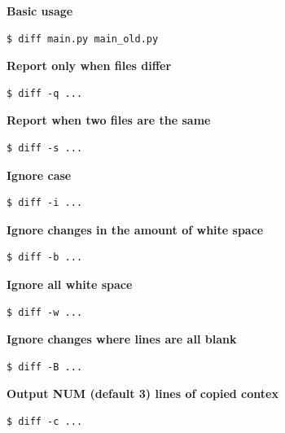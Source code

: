 \documentclass{article}
\newenvironment{codetemplate}[1][]{%
  \mybasecolorbox[#1]
  \itshape
}{%
  \endmybasecolorbox
}
\begin{document}
\textbf{Basic usage}
\begin{codetemplate}{}
\begin{verbatim}
$ diff main.py main_old.py
\end{verbatim}
\end{codetemplate}

\textbf{Report only when files differ}
\begin{codetemplate}{}
\begin{verbatim}
$ diff -q ...
\end{verbatim}
\end{codetemplate}

\textbf{Report when two files are the same}
\begin{codetemplate}{}
\begin{verbatim}
$ diff -s ...
\end{verbatim}
\end{codetemplate}

\textbf{Ignore case}
\begin{codetemplate}{}
\begin{verbatim}
$ diff -i ...
\end{verbatim}
\end{codetemplate}

\textbf{Ignore changes in the amount of white space}
\begin{codetemplate}{}
\begin{verbatim}
$ diff -b ...
\end{verbatim}
\end{codetemplate}

\textbf{Ignore all white space}
\begin{codetemplate}{}
\begin{verbatim}
$ diff -w ...
\end{verbatim}
\end{codetemplate}

\textbf{Ignore changes where lines are all blank}
\begin{codetemplate}{}
\begin{verbatim}
$ diff -B ...
\end{verbatim}
\end{codetemplate}

\textbf{Output NUM (default 3) lines of copied contex}
\begin{codetemplate}{}
\begin{verbatim}
$ diff -c ...
\end{verbatim}
\end{codetemplate}
\end{document}
